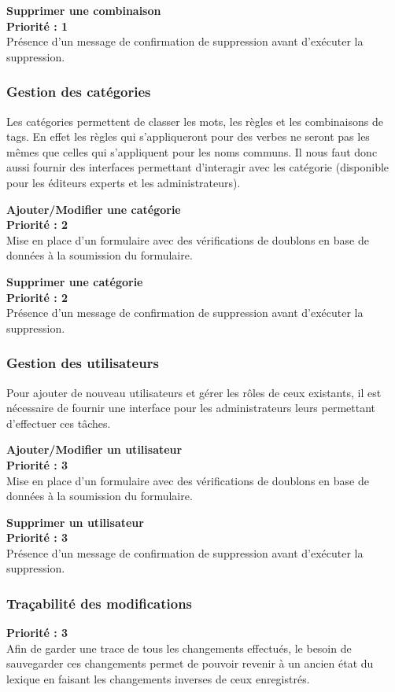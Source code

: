\documentclass[12pt,a4paper]{article}
\begin{document}
    \textbf{Supprimer une combinaison} \\
    \textbf{Priorité : 1} \\
    Présence d'un message de confirmation de suppression avant d'exécuter la suppression.

    \subsubsection{Gestion des catégories}

    Les catégories permettent de classer les mots, les règles et les combinaisons de tags. En effet les règles qui s'appliqueront pour des verbes ne seront pas les mêmes que celles qui s'appliquent pour les noms communs.
    Il nous faut donc aussi fournir des interfaces permettant d'interagir avec les catégorie (disponible pour les éditeurs experts et les administrateurs).

    \textbf{Ajouter/Modifier une catégorie} \\
    \textbf{Priorité : 2 } \\
    Mise en place d'un formulaire avec des vérifications de doublons en base de données à la soumission du formulaire.

    \textbf{Supprimer une catégorie} \\
    \textbf{Priorité : 2 } \\
    Présence d'un message de confirmation de suppression avant d'exécuter la suppression.

    \subsubsection{Gestion des utilisateurs}
    Pour ajouter de nouveau utilisateurs et gérer les rôles de ceux existants, il est nécessaire de fournir une interface pour les administrateurs leurs permettant d'effectuer ces tâches.

    \textbf{Ajouter/Modifier un utilisateur} \\
    \textbf{Priorité : 3 } \\
    Mise en place d'un formulaire avec des vérifications de doublons en base de données à la soumission du formulaire.

    \textbf{Supprimer un utilisateur} \\
    \textbf{Priorité : 3 } \\
    Présence d'un message de confirmation de suppression avant d'exécuter la suppression.

    \subsubsection{Traçabilité des modifications}
    \textbf{Priorité : 3} \\
    Afin de garder une trace de tous les changements effectués, le besoin de sauvegarder ces changements permet de pouvoir revenir à un ancien état du lexique en faisant les changements inverses de ceux enregistrés.
\end{document}

